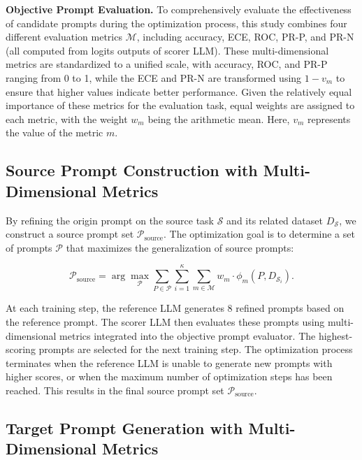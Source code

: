 \textbf{Objective Prompt Evaluation.}  
To comprehensively evaluate the effectiveness of candidate prompts during the optimization process, this study combines four different evaluation metrics \( \mathcal{M} \), including accuracy, ECE, ROC, PR-P, and PR-N (all computed from logits outputs of scorer LLM). These multi-dimensional metrics are standardized to a unified scale, with accuracy, ROC, and PR-P ranging from 0 to 1, while the ECE and PR-N are transformed using \( 1 - v_m \) to ensure that higher values indicate better performance. Given the relatively equal importance of these metrics for the evaluation task, equal weights are assigned to each metric, with the weight \( w_m \) being the arithmetic mean. Here, \( v_m \) represents the value of the metric \( m \).


\subsection{Source Prompt Construction with Multi-Dimensional Metrics}

By refining the origin prompt on the source task $\bm{\mathcal{S}}$ and its related dataset $D_{\mathcal{S}}$, we construct a source prompt set $\mathcal{P}_{\text{source}}$. The optimization goal is to determine a set of prompts $\mathcal{P}$ that maximizes the generalization of source prompts:

\begin{equation}
\mathcal{P}_{\text{source}} = \arg\max_{\mathcal{P}} \sum_{P \in \mathcal{P}} \sum_{i=1}^\kappa \sum_{m \in \mathcal{M}} w_m \cdot \phi_m(P, D_{\mathcal{S}_i}).
\label{eq:source_opt_multi_metric}
\end{equation}

At each training step, the reference LLM generates 8 refined prompts based on the reference prompt. The scorer LLM then evaluates these prompts using multi-dimensional metrics integrated into the objective prompt evaluator. The highest-scoring prompts are selected for the next training step. The optimization process terminates when the reference LLM is unable to generate new prompts with higher scores, or when the maximum number of optimization steps has been reached. This results in the final source prompt set $\mathcal{P}_{\text{source}}$.

\subsection{Target Prompt Generation with Multi-Dimensional Metrics}

